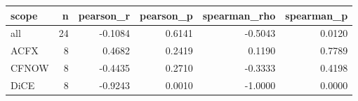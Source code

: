 \begin{tabular}{lrrrrr}
\toprule
scope &  n &  pearson\_r &  pearson\_p &  spearman\_rho &  spearman\_p \\
\midrule
  all & 24 &    -0.1084 &     0.6141 &       -0.5043 &      0.0120 \\
 ACFX &  8 &     0.4682 &     0.2419 &        0.1190 &      0.7789 \\
CFNOW &  8 &    -0.4435 &     0.2710 &       -0.3333 &      0.4198 \\
 DiCE &  8 &    -0.9243 &     0.0010 &       -1.0000 &      0.0000 \\
\bottomrule
\end{tabular}
